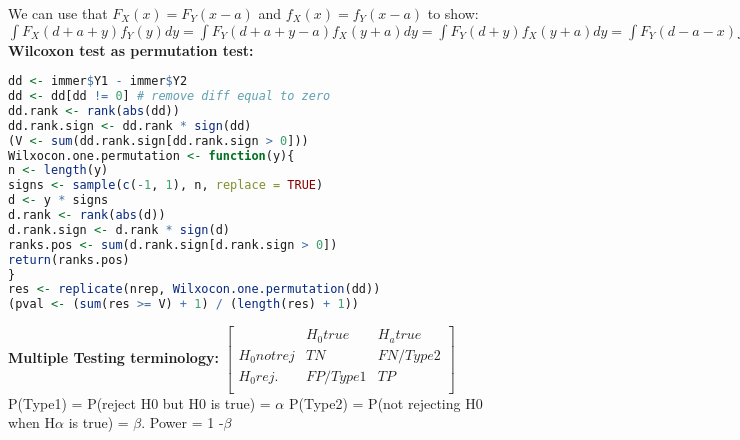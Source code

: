 We can use that $F_X(x)=F_Y(x-a)$ and $f_X(x)=f_Y(x-a)$ to show: $\int F_X(d+a+y)f_Y(y)dy = \int F_Y(d+a+y-a)f_X(y+a)dy = \int F_Y(d+y)f_X(y+a)dy = \int F_Y(d-a-x)f_X(x)dx$ \\
\textbf{Wilcoxon test as permutation test:} 
\begin{lstlisting}[language=R]
dd <- immer$Y1 - immer$Y2
dd <- dd[dd != 0] # remove diff equal to zero
dd.rank <- rank(abs(dd))
dd.rank.sign <- dd.rank * sign(dd)
(V <- sum(dd.rank.sign[dd.rank.sign > 0]))
Wilxocon.one.permutation <- function(y){
n <- length(y)
signs <- sample(c(-1, 1), n, replace = TRUE)
d <- y * signs
d.rank <- rank(abs(d))
d.rank.sign <- d.rank * sign(d)
ranks.pos <- sum(d.rank.sign[d.rank.sign > 0])
return(ranks.pos)
}
res <- replicate(nrep, Wilxocon.one.permutation(dd))
(pval <- (sum(res >= V) + 1) / (length(res) + 1))
\end{lstlisting}
\textbf{Multiple Testing terminology: }
$\begin{bmatrix}
& H_0 true & H_a true \\
H_0 not rej & TN & FN/Type2\\
H_0rej. & FP/Type1 & TP \\
\end{bmatrix}$\\
P(Type1) = P(reject H0 but H0 is true) = $\alpha$
P(Type2) = P(not rejecting H0 when H$\alpha$ is true) = $\beta$. Power = 1 -$\beta$

